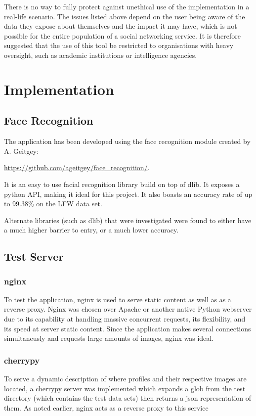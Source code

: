 \documentclass[12pt]{article}
\begin{document}
There is no way to fully protect against unethical use of the implementation in a real-life scenario. The issues listed above depend on the user being aware of the data they expose about themselves and the impact it may have, which is not possible for the entire population of a social networking service. It is therefore suggested that the use of this tool be restricted to organisations with heavy oversight, such as academic institutions or intelligence agencies.

\newpage
\section{Implementation}
\subsection{Face Recognition}
The application has been developed using the face recognition module created by A. Geitgey:

\url{https://github.com/ageitgey/face\_recognition/}.

It is an easy to use facial recognition library build on top of dlib. It exposes a python API, making it ideal for this project. It also boasts an accuracy rate of up to 99.38\% on the LFW data set.

Alternate libraries (such as dlib) that were investigated were found to either have a much higher barrier to entry, or a much lower accuracy.

\subsection{Test Server}
\subsubsection{nginx}
To test the application, nginx is used to serve static content as well as as a reverse proxy. Nginx was chosen over Apache or another native Python webserver due to its capability at handling massive concurrent requests, its flexibility, and its speed at server static content. Since the application makes several connections simultaneusly and requests large amounts of images, nginx was ideal.

\subsubsection{cherrypy}
To serve a dynamic description of where profiles and their respective images are located, a cherrypy server was implemented which expands a glob from the test directory (which contains the test data sets) then returns a json representation of them. As noted earlier, nginx acts as a reverse proxy to this service
\end{document}
